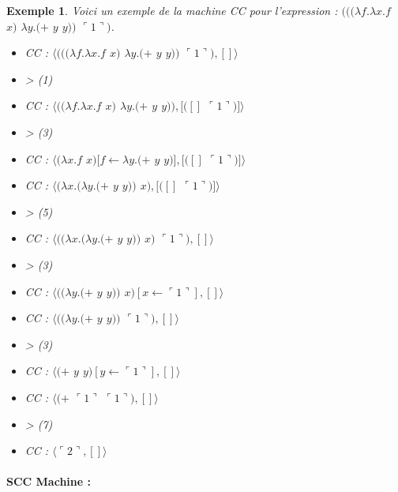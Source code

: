 \documentclass[10pt,a4paper]{report}
\newtheorem{ex}{Exemple}
\begin{document}
	
	\begin{ex}
			Voici un exemple de la machine CC pour l'expression : $(((\lambda f.\lambda x.f$ $x)$ $\lambda y.(+$ $y$ $y))$ $\ulcorner 1\urcorner)$.
		
		\begin{multicols}{2}\raggedright{
				\begin{itemize}
					\item[] CC : $\langle(((\lambda f.\lambda x.f$ $x)$ $\lambda y.(+$ $y$ $y))$ $\ulcorner 1\urcorner),[]\rangle$
					\item[] > (1) 
					\item[] CC : $\langle((\lambda f.\lambda x.f$ $x)$ $\lambda y.(+$ $y$ $y)),[([]$ $\ulcorner 1\urcorner)]\rangle$
					\item[] > (3)
					\item[] CC : $\langle(\lambda x.f$ $x)[f \leftarrow \lambda y.(+$ $y$ $y)],[([]$ $\ulcorner 1\urcorner)]\rangle$
					\item[] CC : $\langle(\lambda x.(\lambda y.(+$ $y$ $y))$ $x),[([]$ $\ulcorner 1\urcorner)]\rangle$
					\item[] > (5)
					
				\end{itemize}
				
				\begin{itemize}
					\item[] CC : $\langle((\lambda x.(\lambda y.(+$ $y$ $y))$ $x)$ $\ulcorner 1\urcorner),[]\rangle$
					\item[] > (3) 
					\item[] CC : $\langle((\lambda y.(+$ $y$ $y))$ $x)[x \leftarrow \ulcorner 1\urcorner],[]\rangle$
					\item[] CC : $\langle((\lambda y.(+$ $y$ $y))$ $\ulcorner 1\urcorner),[]\rangle$
					\item[] > (3) 
					\item[] CC : $\langle(+$ $y$ $y)[y \leftarrow \ulcorner 1\urcorner],[]\rangle$
					\item[] CC : $\langle(+$ $\ulcorner 1\urcorner$ $\ulcorner 1\urcorner),[]\rangle$
					\item[] > (7)
					\item[] CC : $\langle\ulcorner 2\urcorner,[]\rangle$
				\end{itemize}
			}
		\end{multicols}
	\end{ex}
	\newpage
	
	
	
	\paragraph{SCC Machine :}
	
\end{document}
